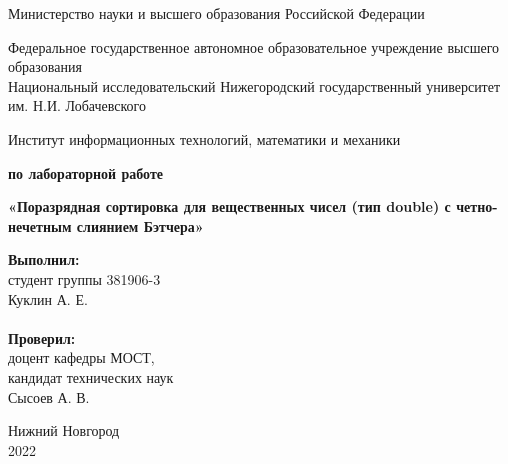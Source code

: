 \documentclass{report}
\begin{document}
\begin{titlepage}

\begin{center}
Министерство науки и высшего образования Российской Федерации
\end{center}

\begin{center}
Федеральное государственное автономное образовательное учреждение высшего образования \\
Национальный исследовательский Нижегородский государственный университет им. Н.И. Лобачевского
\end{center}

\begin{center}
Институт информационных технологий, математики и механики
\end{center}

\vspace{4em}

\begin{center}
\textbf{ по лабораторной работе} \\
\end{center}
\begin{center}
\textbf{\Large«Поразрядная сортировка для вещественных чисел (тип double) с четно-нечетным слиянием Бэтчера»} \\
\end{center}

\vspace{4em}

\newbox{\lbox}
\newlength{\maxl}
\setlength{\maxl}{\wd\lbox}
\hfill\parbox{7cm}{
\hspace*{5cm}\hspace*{-5cm}\textbf{Выполнил:} \\ студент группы 381906-3 \\ Куклин А. Е.\\
\\
\hspace*{5cm}\hspace*{-5cm}\textbf{Проверил:}\\ доцент кафедры МОСТ, \\ кандидат технических наук \\ Сысоев А. В.\\
}
\vspace{\fill}

\begin{center} Нижний Новгород \\ 2022 \end{center}

\end{titlepage}
\end{document}

